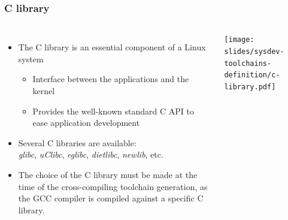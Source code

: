 \begin{frame}
  \frametitle{C library}
  \begin{columns}
    \begin{itemize}
    \item The C library is an essential component of a Linux system
      \begin{itemize}
      \item Interface between the applications and the kernel
      \item Provides the well-known standard C API to ease application
        development
      \end{itemize}
    \item Several C libraries are available:\\
      {\em glibc}, {\em uClibc}, {\em eglibc}, {\em dietlibc}, {\em
        newlib}, etc.
    \item The choice of the C library must be made at the time of the
      cross-compiling toolchain generation, as the GCC compiler is
      compiled against a specific C library.
    \end{itemize}
    \texttt{[image: slides/sysdev-toolchains-definition/c-library.pdf]}
  \end{columns}
\end{frame}
